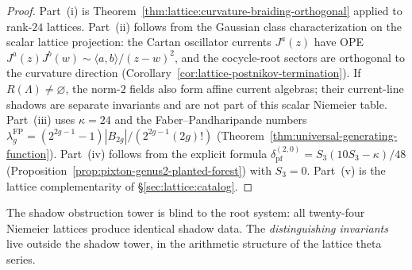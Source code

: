 \begin{proof}
Part~(i) is Theorem~\ref{thm:lattice:curvature-braiding-orthogonal}
applied to rank-$24$ lattices.
Part~(ii) follows from the Gaussian class characterization on the
scalar lattice projection: the Cartan oscillator currents
$J^a(z)$ have OPE
$J^a(z) J^b(w) \sim
\langle a, b \rangle / (z{-}w)^2$, and the cocycle-root sectors are
orthogonal to the curvature direction
(Corollary~\ref{cor:lattice-postnikov-termination}). If
$R(\Lambda)\neq\varnothing$, the norm-$2$ fields also form affine
current algebras; their current-line shadows are separate invariants
and are not part of this scalar Niemeier table.
Part~(iii) uses $\kappa = 24$ and the Faber--Pandharipande
numbers $\lambda_g^{\mathrm{FP}} =
(2^{2g-1}-1) |B_{2g}| / (2^{2g-1} (2g)!)$
(Theorem~\ref{thm:universal-generating-function}).
Part~(iv) follows from the explicit formula
$\delta_{\mathrm{pf}}^{(2,0)} = S_3(10 S_3 - \kappa)/48$
(Proposition~\ref{prop:pixton-genus2-planted-forest})
with $S_3 = 0$.
Part~(v) is the lattice complementarity of
\S\ref{sec:lattice:catalog}.
\end{proof}

The shadow obstruction tower is blind to the root system: all twenty-four
Niemeier lattices produce identical shadow data.
The \emph{distinguishing invariants} live outside the shadow
tower, in the arithmetic structure of the lattice theta series.

